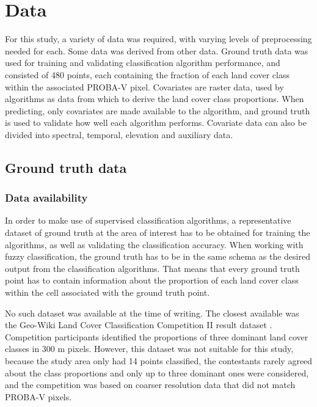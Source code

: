 \documentclass[a4paper,12pt]{scrbook}
\begin{document}
\section{Data}

For this study, a variety of data was required, with varying levels of preprocessing needed for each. Some data was derived from other data. Ground truth data was used for training and validating classification algorithm performance, and consisted of 480 points, each containing the fraction of each land cover class within the associated PROBA-V pixel. Covariates are raster data, used by algorithms as data from which to derive the land cover class proportions. When predicting, only covariates are made available to the algorithm, and ground truth is used to validate how well each algorithm performs. Covariate data can also be divided into spectral, temporal, elevation and auxiliary data.

\subsection{Ground truth data}

\subsubsection{Data availability}

In order to make use of supervised classification algorithms, a representative dataset of ground truth at the area of interest has to be obtained for training the algorithms, as well as validating the classification accuracy. When working with fuzzy classification, the ground truth has to be in the same schema as the desired output from the classification algorithms. That means that every ground truth point has to contain information about the proportion of each land cover class within the cell associated with the ground truth point.

No such dataset was available at the time of writing. The closest available was the Geo-Wiki Land Cover Classification Competition II result dataset \citep{perger2012geowiki}. Competition participants identified the proportions of three dominant land cover classes in 300 m pixels. However, this dataset was not suitable for this study, because the study area only had 14 points classified, the contestants rarely agreed about the class proportions and only up to three dominant ones were considered, and the competition was based on coarser resolution data that did not match PROBA-V pixels.
\end{document}

